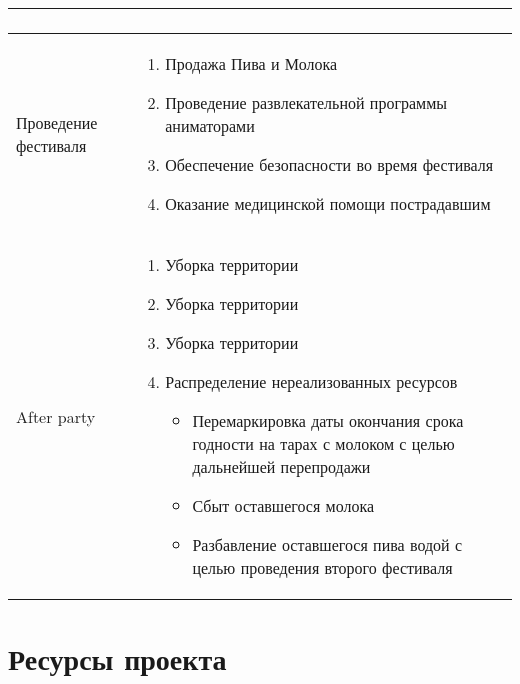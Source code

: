 \documentclass[a4paper,12pt]{article}
\begin{document}
\begin{center}
\begin{longtable}{|p{3cm}|p{11cm}|}
\begin{enumerate}
  \end{enumerate} \\
  \hline
  Проведение фестиваля &
  \begin{enumerate}
    \item Продажа Пива и Молока
    \item Проведение развлекательной программы аниматорами
    \item Обеспечение безопасности во время фестиваля
    \item Оказание медицинской помощи пострадавшим
  \end{enumerate} \\
  \hline
  After party & 
  \begin{enumerate}
    \item Уборка территории
    \item Уборка территории
    \item Уборка территории
    \item Распределение нереализованных ресурсов
      \begin{itemize}
        \item Перемаркировка даты окончания срока годности на тарах с молоком с целью дальнейшей перепродажи
        \item Сбыт оставшегося молока
        \item Разбавление оставшегося пива водой с целью проведения второго фестиваля
      \end{itemize}
  \end{enumerate}\\
  \hline
\end{longtable}
\end{center}
\section{Ресурсы проекта}
\end{document}
